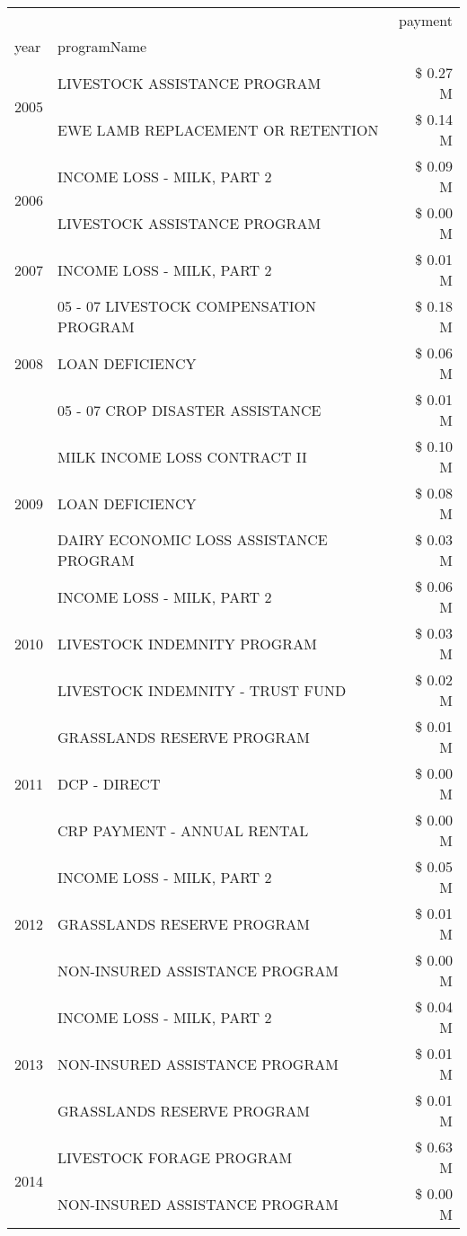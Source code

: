 \begin{tabular}{llr}
\toprule
 &  & payment \\
year & programName &  \\
\midrule
\multirow[t]{2}{*}{2005} & LIVESTOCK ASSISTANCE PROGRAM & \$ 0.27 M \\
 & EWE LAMB REPLACEMENT OR RETENTION & \$ 0.14 M \\
\cline{1-3}
\multirow[t]{2}{*}{2006} & INCOME LOSS - MILK, PART 2 & \$ 0.09 M \\
 & LIVESTOCK ASSISTANCE PROGRAM & \$ 0.00 M \\
\cline{1-3}
2007 & INCOME LOSS - MILK, PART 2 & \$ 0.01 M \\
\cline{1-3}
\multirow[t]{3}{*}{2008} & 05 - 07 LIVESTOCK COMPENSATION PROGRAM & \$ 0.18 M \\
 & LOAN DEFICIENCY & \$ 0.06 M \\
 & 05 - 07 CROP DISASTER ASSISTANCE & \$ 0.01 M \\
\cline{1-3}
\multirow[t]{3}{*}{2009} & MILK INCOME LOSS CONTRACT II & \$ 0.10 M \\
 & LOAN DEFICIENCY & \$ 0.08 M \\
 & DAIRY ECONOMIC LOSS ASSISTANCE PROGRAM & \$ 0.03 M \\
\cline{1-3}
\multirow[t]{3}{*}{2010} & INCOME LOSS - MILK, PART 2 & \$ 0.06 M \\
 & LIVESTOCK INDEMNITY PROGRAM & \$ 0.03 M \\
 & LIVESTOCK INDEMNITY - TRUST FUND & \$ 0.02 M \\
\cline{1-3}
\multirow[t]{3}{*}{2011} & GRASSLANDS RESERVE PROGRAM & \$ 0.01 M \\
 & DCP - DIRECT & \$ 0.00 M \\
 & CRP PAYMENT - ANNUAL RENTAL & \$ 0.00 M \\
\cline{1-3}
\multirow[t]{3}{*}{2012} & INCOME LOSS - MILK, PART 2 & \$ 0.05 M \\
 & GRASSLANDS RESERVE PROGRAM & \$ 0.01 M \\
 & NON-INSURED ASSISTANCE PROGRAM & \$ 0.00 M \\
\cline{1-3}
\multirow[t]{3}{*}{2013} & INCOME LOSS - MILK, PART 2 & \$ 0.04 M \\
 & NON-INSURED ASSISTANCE PROGRAM & \$ 0.01 M \\
 & GRASSLANDS RESERVE PROGRAM & \$ 0.01 M \\
\cline{1-3}
\multirow[t]{3}{*}{2014} & LIVESTOCK FORAGE PROGRAM & \$ 0.63 M \\
 & NON-INSURED ASSISTANCE PROGRAM & \$ 0.00 M \\

\end{tabular}

